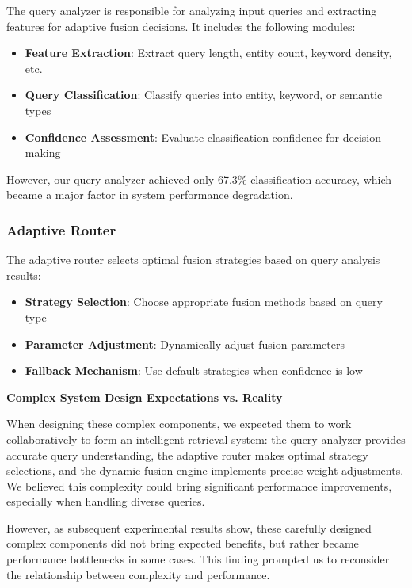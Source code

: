 \documentclass[letterpaper]{article} %
\begin{document}
The query analyzer is responsible for analyzing input queries and extracting features for adaptive fusion decisions. It includes the following modules:

\begin{itemize}
\item \textbf{Feature Extraction}: Extract query length, entity count, keyword density, etc.
\item \textbf{Query Classification}: Classify queries into entity, keyword, or semantic types
\item \textbf{Confidence Assessment}: Evaluate classification confidence for decision making
\end{itemize}

However, our query analyzer achieved only 67.3\% classification accuracy, which became a major factor in system performance degradation.

\subsubsection{Adaptive Router}

The adaptive router selects optimal fusion strategies based on query analysis results:

\begin{itemize}
\item \textbf{Strategy Selection}: Choose appropriate fusion methods based on query type
\item \textbf{Parameter Adjustment}: Dynamically adjust fusion parameters
\item \textbf{Fallback Mechanism}: Use default strategies when confidence is low
\end{itemize}

\textbf{Complex System Design Expectations vs. Reality}

When designing these complex components, we expected them to work collaboratively to form an intelligent retrieval system: the query analyzer provides accurate query understanding, the adaptive router makes optimal strategy selections, and the dynamic fusion engine implements precise weight adjustments. We believed this complexity could bring significant performance improvements, especially when handling diverse queries.

However, as subsequent experimental results show, these carefully designed complex components did not bring expected benefits, but rather became performance bottlenecks in some cases. This finding prompted us to reconsider the relationship between complexity and performance.
\end{document}
